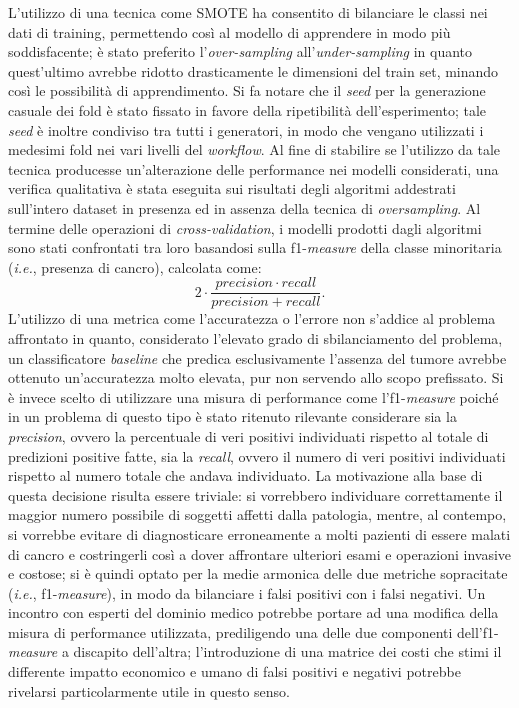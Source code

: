 L'utilizzo di una tecnica come SMOTE ha consentito di bilanciare le classi nei dati di training, permettendo così al modello di apprendere in modo più soddisfacente; è stato preferito l'\textit{over-sampling} all'\textit{under-sampling} in quanto quest'ultimo avrebbe ridotto drasticamente le dimensioni del train set, minando così le possibilità di apprendimento.
Si fa notare che il \textit{seed} per la generazione casuale dei fold è stato fissato in favore della ripetibilità dell'esperimento; tale \textit{seed} è inoltre condiviso tra tutti i generatori, in modo che vengano utilizzati i medesimi fold nei vari livelli del \textit{workflow}.
Al fine di stabilire se l'utilizzo da tale tecnica producesse un'alterazione delle performance nei modelli considerati, una verifica qualitativa è stata eseguita sui risultati degli algoritmi addestrati sull'intero dataset in presenza ed in assenza della tecnica di \textit{oversampling}.
Al termine delle operazioni di \textit{cross-validation}, i modelli prodotti dagli algoritmi sono stati confrontati tra loro basandosi sulla f1-\textit{measure} della classe minoritaria (\textit{i.e.}, presenza di cancro), calcolata come: \[2 \cdot \frac{precision \cdot recall}{precision+recall}.\]
L'utilizzo di una metrica come l'accuratezza o l'errore non s'addice al problema affrontato in quanto, considerato l'elevato grado di sbilanciamento del problema, un classificatore \textit{baseline} che predica esclusivamente l'assenza del tumore avrebbe ottenuto un'accuratezza molto elevata, pur non servendo allo scopo prefissato. 
Si è invece scelto di utilizzare una misura di performance come l'f1-\textit{measure} poiché in un problema di questo tipo è stato ritenuto rilevante considerare sia la \textit{precision}, ovvero la percentuale di veri positivi individuati rispetto al totale di predizioni positive fatte, sia la \textit{recall}, ovvero il numero di veri positivi individuati rispetto al numero totale che andava individuato. 
La motivazione alla base di questa decisione risulta essere triviale: si vorrebbero individuare correttamente il maggior numero possibile di soggetti affetti dalla patologia, mentre, al contempo, si vorrebbe evitare di diagnosticare erroneamente a molti pazienti di essere malati di cancro e costringerli così a dover affrontare ulteriori esami e operazioni invasive e costose; si è quindi optato per la medie armonica delle due metriche sopracitate (\textit{i.e.}, f1-\textit{measure}), in modo da bilanciare i falsi positivi con i falsi negativi.
Un incontro con esperti del dominio medico potrebbe portare ad una modifica della misura di performance utilizzata, prediligendo una delle due componenti dell'f1-\textit{measure} a discapito dell'altra; l'introduzione di una matrice dei costi che stimi il differente impatto economico e umano di falsi positivi e negativi potrebbe rivelarsi particolarmente utile in questo senso.\\
